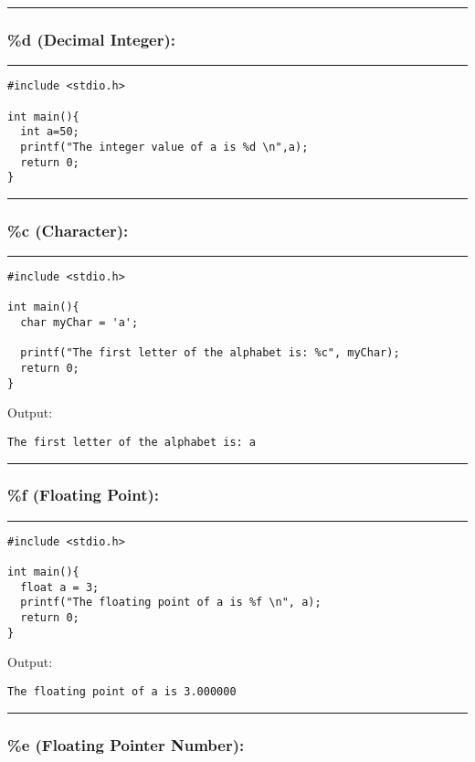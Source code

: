 \documentclass[a4paper]{article}
\begin{document}
\noindent\rule{\textwidth}{0.5pt}


\subsubsection{\%d (Decimal Integer):}
\label{sec:orga22bd0f}

\noindent\rule{\textwidth}{0.5pt}
\begin{verbatim}
#include <stdio.h>

int main(){
  int a=50;
  printf("The integer value of a is %d \n",a);
  return 0;
}
\end{verbatim}

\noindent\rule{\textwidth}{0.5pt}

\subsubsection{\%c (Character):}
\label{sec:org76f076e}

\noindent\rule{\textwidth}{0.5pt}
\begin{verbatim}
#include <stdio.h>

int main(){
  char myChar = 'a';

  printf("The first letter of the alphabet is: %c", myChar);
  return 0;
}
\end{verbatim}
Output:
\begin{verbatim}
The first letter of the alphabet is: a
\end{verbatim}

\noindent\rule{\textwidth}{0.5pt}

\subsubsection{\%f (Floating Point):}
\label{sec:org966b291}

\noindent\rule{\textwidth}{0.5pt}
\begin{verbatim}
#include <stdio.h>

int main(){
  float a = 3;
  printf("The floating point of a is %f \n", a);
  return 0;
}
\end{verbatim}
Output:
\begin{verbatim}
The floating point of a is 3.000000 
\end{verbatim}

\noindent\rule{\textwidth}{0.5pt}

\subsubsection{\%e (Floating Pointer Number):}
\label{sec:org57f20b5}
\end{document}
